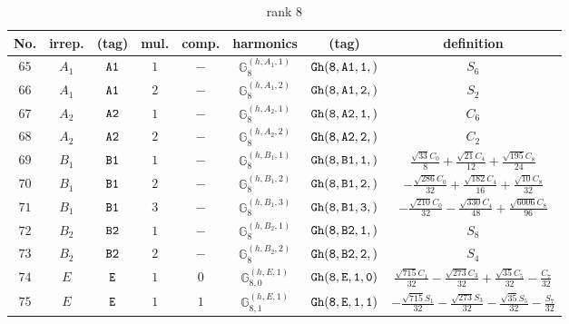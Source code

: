 \documentclass[fleqn,8pt]{jsarticle}
\begin{document}
\begin{table}[ht!]
\begin{center}
\caption{rank 8}
\renewcommand{\arraystretch}{1.3}
\begin{tabular}{cccccccc} \hline \hline
No. & irrep. & (tag) & mul. & comp. & harmonics & (tag) & definition \\ \hline
$ 65 $ & $ A_{1} $ & $ {\tt A1} $ & $ 1 $ & $ - $ & $ \mathbb{G}_{8}^{(h,A_{1},1)} $ & $ {\tt Gh(8,A1,1,)} $ & $ S_{6} $ \\
$ 66 $ & $ A_{1} $ & $ {\tt A1} $ & $ 2 $ & $ - $ & $ \mathbb{G}_{8}^{(h,A_{1},2)} $ & $ {\tt Gh(8,A1,2,)} $ & $ S_{2} $ \\
$ 67 $ & $ A_{2} $ & $ {\tt A2} $ & $ 1 $ & $ - $ & $ \mathbb{G}_{8}^{(h,A_{2},1)} $ & $ {\tt Gh(8,A2,1,)} $ & $ C_{6} $ \\
$ 68 $ & $ A_{2} $ & $ {\tt A2} $ & $ 2 $ & $ - $ & $ \mathbb{G}_{8}^{(h,A_{2},2)} $ & $ {\tt Gh(8,A2,2,)} $ & $ C_{2} $ \\
$ 69 $ & $ B_{1} $ & $ {\tt B1} $ & $ 1 $ & $ - $ & $ \mathbb{G}_{8}^{(h,B_{1},1)} $ & $ {\tt Gh(8,B1,1,)} $ & $ \frac{\sqrt{33} C_{0}}{8} + \frac{\sqrt{21} C_{4}}{12} + \frac{\sqrt{195} C_{8}}{24} $ \\
$ 70 $ & $ B_{1} $ & $ {\tt B1} $ & $ 2 $ & $ - $ & $ \mathbb{G}_{8}^{(h,B_{1},2)} $ & $ {\tt Gh(8,B1,2,)} $ & $ - \frac{\sqrt{286} C_{0}}{32} + \frac{\sqrt{182} C_{4}}{16} + \frac{\sqrt{10} C_{8}}{32} $ \\
$ 71 $ & $ B_{1} $ & $ {\tt B1} $ & $ 3 $ & $ - $ & $ \mathbb{G}_{8}^{(h,B_{1},3)} $ & $ {\tt Gh(8,B1,3,)} $ & $ - \frac{\sqrt{210} C_{0}}{32} - \frac{\sqrt{330} C_{4}}{48} + \frac{\sqrt{6006} C_{8}}{96} $ \\
$ 72 $ & $ B_{2} $ & $ {\tt B2} $ & $ 1 $ & $ - $ & $ \mathbb{G}_{8}^{(h,B_{2},1)} $ & $ {\tt Gh(8,B2,1,)} $ & $ S_{8} $ \\
$ 73 $ & $ B_{2} $ & $ {\tt B2} $ & $ 2 $ & $ - $ & $ \mathbb{G}_{8}^{(h,B_{2},2)} $ & $ {\tt Gh(8,B2,2,)} $ & $ S_{4} $ \\
$ 74 $ & $ E $ & $ {\tt E} $ & $ 1 $ & $ 0 $ & $ \mathbb{G}_{8,0}^{(h,E,1)} $ & $ {\tt Gh(8,E,1,0)} $ & $ \frac{\sqrt{715} C_{1}}{32} - \frac{\sqrt{273} C_{3}}{32} + \frac{\sqrt{35} C_{5}}{32} - \frac{C_{7}}{32} $ \\
$ 75 $ & $ E $ & $ {\tt E} $ & $ 1 $ & $ 1 $ & $ \mathbb{G}_{8,1}^{(h,E,1)} $ & $ {\tt Gh(8,E,1,1)} $ & $ - \frac{\sqrt{715} S_{1}}{32} - \frac{\sqrt{273} S_{3}}{32} - \frac{\sqrt{35} S_{5}}{32} - \frac{S_{7}}{32} $ \\

\end{tabular}
\end{center}
\end{table}
\end{document}
